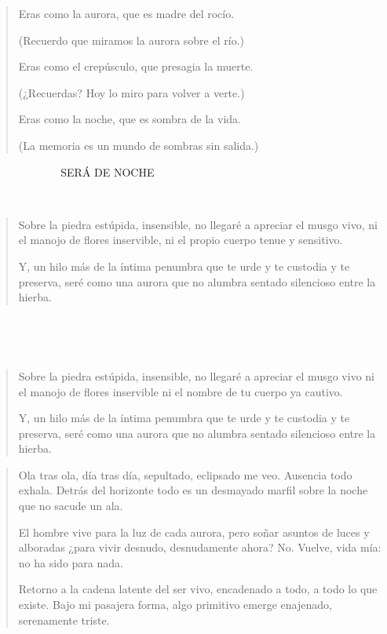 \documentclass[a4paper, 12pt]{article}
\begin{document}
\pagebreak 

\begin{verse}
    Eras como la aurora,
    que es madre del rocío.

    (Recuerdo que miramos
    la aurora sobre el río.)

    Eras como el crepúsculo,
    que presagia la muerte.

    (¿Recuerdas? Hoy lo miro 
    para volver a verte.)

    Eras como la noche,
    que es sombra de la vida.

    (La memoria es un mundo 
    de sombras sin salida.)
\end{verse}


\pagebreak 

~ ~ ~ ~ ~ ~ ~ ~ SERÁ DE NOCHE

~ 


\begin{verse}
    Sobre la piedra estúpida, insensible,
    no llegaré a apreciar el musgo vivo,
    ni el manojo de flores inservible,
    ni el propio cuerpo tenue y sensitivo. 

    Y, un hilo más de la íntima penumbra 
    que te urde y te custodia y te preserva, 
    seré como una aurora que no alumbra 
    sentado silencioso entre la hierba.
\end{verse}

~ 

~

\begin{verse}
    Sobre la piedra estúpida, insensible,
    no llegaré a apreciar el musgo vivo
    ni el manojo de flores inservible
    ni el nombre de tu cuerpo ya cautivo.

    Y, un hilo más de la íntima penumbra 
    que te urde y te custodia y te preserva, 
    seré como una aurora que no alumbra 
    sentado silencioso entre la hierba.
\end{verse}


\pagebreak 

\begin{verse}

Ola tras ola, día tras día, sepultado,
eclipsado me veo. Ausencia todo exhala.
Detrás del horizonte todo es un desmayado
marfil sobre la noche que no sacude un ala.

El hombre vive para la luz de cada aurora,
pero soñar asuntos de luces y alboradas
¿para vivir desnudo, desnudamente ahora?
No. Vuelve, vida mía: no ha sido para nada.

Retorno a la cadena latente del ser vivo,
encadenado a todo, a todo lo que existe.
Bajo mi pasajera forma, algo primitivo
emerge enajenado, serenamente triste.
\end{verse}
\end{document}
